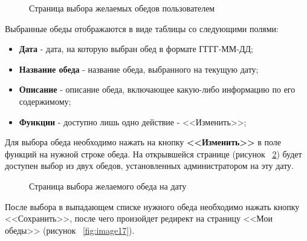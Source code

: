 \documentclass[a4paper]{article}
\begin{document}
\begin{figure}[h]
\caption{Страница выбора желаемых обедов пользователем}
\label{fig:image15}
\end{figure}

Выбранные обеды отображаются в виде таблицы со следующими полями:

\begin{itemize}
\setlength{\itemsep}{-2mm}
	\item \textbf{Дата} - дата, на которую выбран обед в формате ГГГГ-ММ-ДД;
	\item \textbf{Название обеда} - название обеда, выбранного на текущую дату;
	\item \textbf{Описание} - описание обеда, включающее какую-либо информацию по его содержимому;
	\item \textbf{Функции} - доступно лишь одно действие - <<Изменить>>; 
\end{itemize}

Для выбора обеда необходимо нажать на кнопку \textbf{<<Изменить>>} в поле функций на нужной строке обеда. На открывшейся странице (рисунок ~\ref{fig:image16}) будет доступен выбор из двух обедов, установленных администратором на эту дату. 

\begin{figure}[h!]
\caption{Страница выбора желаемого обеда на дату}
\label{fig:image16}
\end{figure}

После выбора в выпадающем списке нужного обеда необходимо нажать кнопку <<Сохранить>>, после чего произойдет редирект на страницу <<Мои обеды>> (рисунок ~\ref{fig:image17}).
\end{document}
